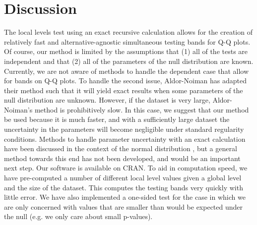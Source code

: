 \documentclass[article]{jss}
\begin{document}
\section{Discussion}
\label{sec:discussion}
The local levels test using an exact recursive calculation allows for the creation of relatively fast and alternative-agnostic simultaneous testing bands for Q-Q plots. Of course, our method is limited by the assumptions that (1) all of the tests are independent and that (2) all of the parameters of the null distribution are known. Currently, we are not aware of methods to handle the dependent case that allow for bands on Q-Q plots. To handle the second issue, Aldor-Noiman has adapted their method such that it will yield exact results when some parameters of the null distribution are unknown. However, if the dataset is very large, Aldor-Noiman's method is prohibitively slow. In this case, we suggest that our method be used because it is much faster, and with a sufficiently large dataset the uncertainty in the parameters will become negligible under standard regularity conditions. Methods to handle parameter uncertainty with an exact calculation have been discussed in the context of the normal distribution \citep{rosenkrantz2000confidence}, but a general method towards this end has not been developed, and would be an important next step.
\newline
\newline
Our software is available on CRAN. To aid in computation speed, we have pre-computed a number of different local level values given a global level and the size of the dataset. This computes the testing bands very quickly with little error. We have also implemented a one-sided test for the case in which we are only concerned with values that are smaller than would be expected under the null (e.g. we only care about small p-values).


%
\end{document}
